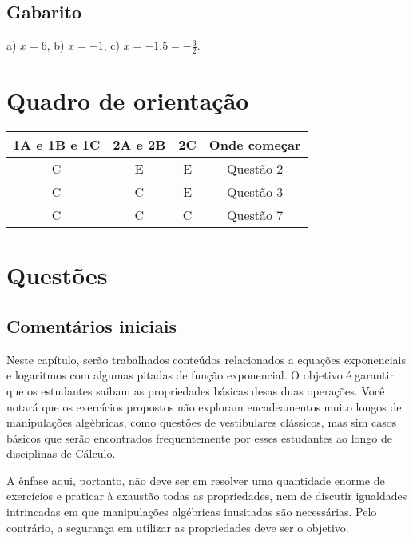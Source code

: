 \documentclass[main.tex]{subfiles}
\begin{document}
\paraTutores

\subsection{Gabarito}

a) $x=6$, b) $x=-1$, c) $x=-1.5=-\frac{3}{2}$.

\section{Quadro de orientação}

\begin{center}
 \begin{tabular}{|c c c |c|} 
 \hline
 1A e 1B e 1C & 2A e 2B & 2C & Onde começar\\
 \hline
 C & E & E & Questão 2 \\ 
 \hline
 C & C & E & Questão 3 \\ 
 \hline
 C & C & C & Questão 7 \\ 
 \hline
\end{tabular}
\end{center}

\paraAmbos

\newpage

\section{Questões}

\paraTutores

\subsection{Comentários iniciais}

Neste capítulo, serão trabalhados conteúdos relacionados a equações exponenciais e logaritmos com algumas pitadas de função exponencial. O objetivo é garantir que os estudantes saibam as propriedades básicas desas duas operações. Você notará que os exercícios propostos não exploram encadeamentos muito longos de manipulações algébricas, como questões de vestibulares clássicos, mas sim casos básicos que serão encontrados frequentemente por esses estudantes ao longo de disciplinas de Cálculo.

A ênfase aqui, portanto, não deve ser em resolver uma quantidade enorme de exercícios e praticar à exaustão todas as propriedades, nem de discutir igualdades intrincadas em que manipulações algébricas inusitadas são necessárias. Pelo contrário, a segurança em utilizar as propriedades deve ser o objetivo.
\end{document}
